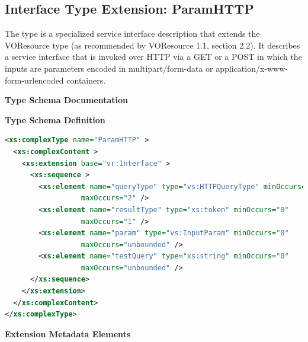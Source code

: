 \documentclass[11pt,a4paper]{ivoa}
\begin{document}
\subsection{Interface Type Extension: ParamHTTP}
\label{sect:paramif}


The  type is a specialized service interface
description that extends the VOResource  type 
(as recommended by VOResource 1.1, section 2.2).  It
describes a service interface that is invoked over HTTP via a GET or a
POST in which the inputs are parameters
encoded in multipart/form-data or application/x-www-form-urlencoded
containers.

\begin{generated}
\begingroup
      	\renewcommand*\descriptionlabel[1]{%
      	\hbox to 5.5em{\emph{#1}\hfil}}\vspace{2ex}\noindent\textbf{ Type Schema Documentation}



\vspace{1ex}\noindent\textbf{ Type Schema Definition}

\begin{lstlisting}[language=XML,basicstyle=\footnotesize]
<xs:complexType name="ParamHTTP" >
  <xs:complexContent >
    <xs:extension base="vr:Interface" >
      <xs:sequence >
        <xs:element name="queryType" type="vs:HTTPQueryType" minOccurs="0"
                  maxOccurs="2" />
        <xs:element name="resultType" type="xs:token" minOccurs="0"
                  maxOccurs="1" />
        <xs:element name="param" type="vs:InputParam" minOccurs="0"
                  maxOccurs="unbounded" />
        <xs:element name="testQuery" type="xs:string" minOccurs="0"
                  maxOccurs="unbounded" />
      </xs:sequence>
    </xs:extension>
  </xs:complexContent>
</xs:complexType>
\end{lstlisting}

\vspace{0.5ex}\noindent\textbf{ Extension Metadata Elements}


\end{generated}
\end{document}
